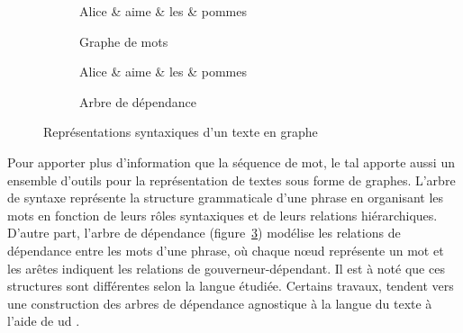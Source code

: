 \begin{figure}[htb]
    \begin{subfigure}{.45\textwidth}
        \centering
        \footnotesize
        \begin{adjustbox}{width=.7\linewidth}
            \begin{dependency}[theme=simple, hide label, column sep=4em]
                \begin{deptext}
                    Alice \& aime \& les \& pommes \\
                \end{deptext}
            \end{dependency}
        \end{adjustbox}
        \caption{Graphe de mots}
        \label{fig:struct:word-graph}
    \end{subfigure}
    \hfill
    \begin{subfigure}{.45\textwidth}
        \centering
        \footnotesize
        \begin{adjustbox}{width=.7\linewidth}
            \begin{dependency}[theme=simple, column sep=4em]
                \begin{deptext}
                    Alice \& aime \& les \& pommes \\
                \end{deptext}
            \end{dependency}
        \end{adjustbox}
        \caption{Arbre de dépendance}
        \label{fig:struct:dep-graph}
    \end{subfigure}
    \caption{Représentations syntaxiques d'un texte en graphe}
\end{figure}

Pour apporter plus d'information que la séquence de mot, le \gls{tal} apporte aussi un ensemble d'outils pour la représentation de textes sous forme de graphes.
L'arbre de syntaxe représente la structure grammaticale d'une phrase en organisant les mots en fonction de leurs rôles syntaxiques et de leurs relations hiérarchiques.
D'autre part, l'arbre de dépendance (figure~\ref{fig:struct:dep-graph}) modélise les relations de dépendance entre les mots d'une phrase, où chaque nœud représente un mot et les arêtes indiquent les relations de gouverneur-dépendant.
Il est à noté que ces structures sont différentes selon la langue étudiée.
Certains travaux, tendent vers une construction des arbres de dépendance agnostique à la langue du texte à l'aide de \gls{ud} \cite{nivreUniversalGrammarNatural2015}.


